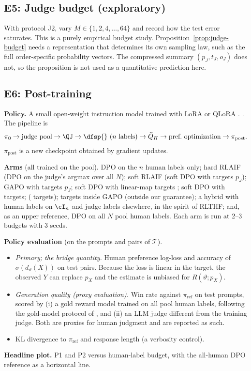 \subsection{E5: Judge budget (exploratory)}

With protocol J2, vary $M\in\{1,2,4,\dots,64\}$ and record how the \dfsp{} test error saturates.
This is a purely empirical budget study. Proposition~\ref{prop:judge-budget} needs a representation
that determines its own sampling law, such as the full order-specific probability vectors. The
compressed summary $(p_J,t_J,o_J)$ does not, so the proposition is not used as a quantitative
prediction here.

\subsection{E6: Post-training}

\textbf{Policy.} A small open-weight instruction model trained with LoRA or QLoRA
\citep{hu2022lora,dettmers2023qlora}. . The
pipeline is
\[
  \pi_0\to\text{judge pool}\to\QJ\to\text{\dfsp{} ($n$ labels)}\to\widehat Q_H
  \to\text{pref.\ optimization}\to\pi_{\mathrm{post}}.
\]
$\pi_{\mathrm{post}}$ is a new checkpoint obtained by gradient updates.

\textbf{Arms} (all trained on the pool). DPO on the $n$ human labels only; hard RLAIF (DPO on the
judge's argmax over all $N$); soft RLAIF (soft DPO with targets $p_J$); GAPO with targets $p_J$; soft
DPO with linear-map targets \citep{vandenburg2025aligning}; soft DPO with \sfsp{} targets; \fsppo{}
(\dfsp{} targets); \fsppo{} targets inside GAPO (outside our guarantee); a hybrid with human labels
on $\cI_n$ and judge labels elsewhere, in the spirit of RLTHF; and, as an upper reference, DPO on all
$N$ pool human labels. Each arm is run at 2--3 budgets with 3 seeds.

\textbf{Policy evaluation} (on the prompts and pairs of $\mathcal T$).
\begin{itemize}
  \item[P1] \emph{Primary; the bridge quantity.} Human preference log-loss and accuracy of
        $\sigma(d_\vartheta(X))$ on test pairs. Because the loss is linear in the target, the
        observed $Y$ can replace $p_X$ and the estimate is unbiased for $R(\vartheta;p_X)$.
  \item[P2] \emph{Generation quality (proxy evaluation).} Win rate against $\pi_{\mathrm{ref}}$ on test
        prompts, scored by (i) a gold reward model trained on all pool human labels, following the
        gold-model protocol of \citet{gao2023scaling}, and (ii) an LLM judge different from the
        training judge. Both are proxies for human judgment and are reported as such.
  \item[P3] KL divergence to $\pi_{\mathrm{ref}}$ and response length (a verbosity control).
\end{itemize}
\textbf{Headline plot.} P1 and P2 versus human-label budget, with the all-human DPO reference as a
horizontal line.

